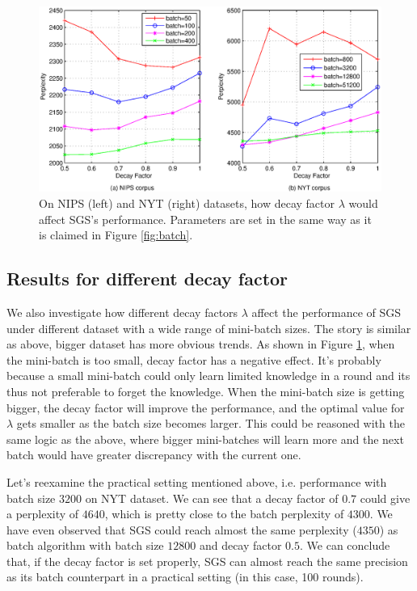 \documentclass{article}
\begin{document}
\begin{figure}[ht]
\vskip 0.2in
\begin{center}
\centerline{\includegraphics[width=\columnwidth*6/5]{pics/decay.eps}}
\caption{ On NIPS (left) and NYT (right) datasets, how decay factor $\lambda$ 
would affect SGS's performance. Parameters are set in the same way as it is claimed in Figure \ref{fig:batch}.}
\label{fig:decay}
\end{center}
\vskip -0.2in
\end{figure} 

\subsection{Results for different decay factor}
We also investigate how different decay factors $\lambda$ affect the performance of SGS under different dataset with a wide range of mini-batch sizes. The story is similar as above, bigger dataset has more obvious trends. As shown in Figure \ref{fig:decay}, when the mini-batch is too small, decay factor has a negative effect. It's probably because a small mini-batch could only learn limited knowledge in a round and its thus not preferable to forget the knowledge. When the mini-batch size is getting bigger, the decay factor will improve the performance, and the optimal value for $\lambda$ gets smaller as the batch size becomes larger. This could be reasoned with the same logic as the above, where bigger mini-batches will learn more and the next batch would have greater discrepancy with the current one. 

Let's reexamine the practical setting mentioned above, i.e. performance with batch size $3200$ on NYT dataset. We can see that a decay factor of $0.7$ could give a perplexity of $4640$, which is pretty close to the batch perplexity of $4300$. We have even observed that SGS could reach almost the same perplexity ($4350$) as batch algorithm with batch size $12800$ and decay factor $0.5$. We can conclude that, if the decay factor is set properly, SGS can almost reach the same precision as its batch counterpart in a practical setting (in this case, 100 rounds). 
\end{document}
